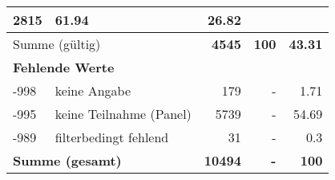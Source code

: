 \begin{longtable}{lXrrr}
       \num{2815} &
       \num[round-mode=places,round-precision=2]{61,94} &
         \num[round-mode=places,round-precision=2]{26,82} \\
     \midrule
     \multicolumn{2}{l}{Summe (gültig)} &
       \textbf{\num{4545}} &
     \textbf{100} &
       \textbf{\num[round-mode=places,round-precision=2]{43,31}} \\
     \multicolumn{5}{l}{\textbf{Fehlende Werte}}\\
       -998 &
       keine Angabe &
         \num{179} &
        - &
         \num[round-mode=places,round-precision=2]{1,71} \\
       -995 &
       keine Teilnahme (Panel) &
         \num{5739} &
        - &
         \num[round-mode=places,round-precision=2]{54,69} \\
       -989 &
       filterbedingt fehlend &
         \num{31} &
        - &
         \num[round-mode=places,round-precision=2]{0,3} \\
     \midrule
     \multicolumn{2}{l}{\textbf{Summe (gesamt)}} &
          \textbf{\num{10494}} &
        \textbf{-} &
        \textbf{100} \\
     \bottomrule
     \end{longtable}
     
